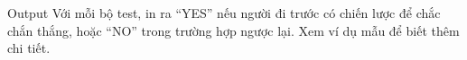 Output
Với mỗi bộ test, in ra “YES” nếu người đi trước có chiến lược để chắc chắn thắng, hoặc “NO” trong trường hợp ngược lại. Xem ví dụ mẫu để biết thêm chi tiết.